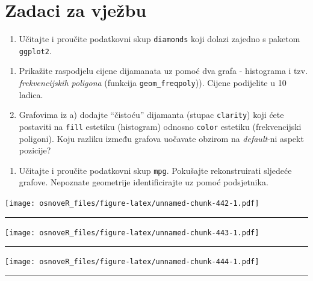 \documentclass[]{book}
\providecommand{\tightlist}{%
  \setlength{\itemsep}{0pt}\setlength{\parskip}{0pt}}
\theoremstyle{definition}
\theoremstyle{definition}
\theoremstyle{definition}
\theoremstyle{remark}
\begin{document}
\section*{Zadaci za vježbu}\label{zadaci-za-vjezbu-10}

\begin{enumerate}
\def\labelenumi{\arabic{enumi}.}
\tightlist
\item
  Učitajte i proučite podatkovni skup \texttt{diamonds} koji dolazi
  zajedno s paketom \texttt{ggplot2}.
\end{enumerate}

\begin{enumerate}
\def\labelenumi{\alph{enumi})}
\item
  Prikažite raspodjelu cijene dijamanata uz pomoć dva grafa - histograma
  i tzv. \emph{frekvencijskih poligona} (funkcija
  \texttt{geom\_freqpoly})). Cijene podijelite u 10 ladica.
\item
  Grafovima iz a) dodajte ``čistoću'' dijamanta (stupac
  \texttt{clarity}) koji ćete postaviti na \texttt{fill} estetiku
  (histogram) odnosno \texttt{color} estetiku (frekvencijski poligoni).
  Koju razliku između grafova uočavate obzirom na \emph{default}-ni
  aspekt pozicije?
\end{enumerate}

\begin{enumerate}
\def\labelenumi{\arabic{enumi}.}
\setcounter{enumi}{1}
\tightlist
\item
  Učitajte i proučite podatkovni skup \texttt{mpg}. Pokušajte
  rekonstruirati sljedeće grafove. Nepoznate geometrije identificirajte
  uz pomoć podsjetnika.
\end{enumerate}

\texttt{[image: osnoveR\_files/figure-latex/unnamed-chunk-442-1.pdf]}

\begin{center}\rule{0.5\linewidth}{\linethickness}\end{center}

\texttt{[image: osnoveR\_files/figure-latex/unnamed-chunk-443-1.pdf]}

\begin{center}\rule{0.5\linewidth}{\linethickness}\end{center}

\texttt{[image: osnoveR\_files/figure-latex/unnamed-chunk-444-1.pdf]}

\begin{center}\rule{0.5\linewidth}{\linethickness}\end{center}
\end{document}
